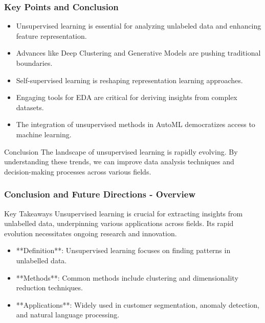 \documentclass[aspectratio=169]{beamer}
\begin{document}
\begin{frame}[fragile]
    \frametitle{Key Points and Conclusion}
    \begin{itemize}
        \item Unsupervised learning is essential for analyzing unlabeled data and enhancing feature representation.
        \item Advances like Deep Clustering and Generative Models are pushing traditional boundaries.
        \item Self-supervised learning is reshaping representation learning approaches.
        \item Engaging tools for EDA are critical for deriving insights from complex datasets.
        \item The integration of unsupervised methods in AutoML democratizes access to machine learning.
    \end{itemize}
    \begin{block}{Conclusion}
        The landscape of unsupervised learning is rapidly evolving. By understanding these trends, we can improve data analysis techniques and decision-making processes across various fields.
    \end{block}
\end{frame}

\begin{frame}[fragile]
  \frametitle{Conclusion and Future Directions - Overview}
  
  \begin{block}{Key Takeaways}
    Unsupervised learning is crucial for extracting insights from unlabelled data, underpinning various applications across fields. Its rapid evolution necessitates ongoing research and innovation.
  \end{block}
  
  \begin{itemize}
     \item **Definition**: Unsupervised learning focuses on finding patterns in unlabelled data.
     \item **Methods**: Common methods include clustering and dimensionality reduction techniques.
     \item **Applications**: Widely used in customer segmentation, anomaly detection, and natural language processing.
  \end{itemize}
  
\end{frame}
\end{document}
